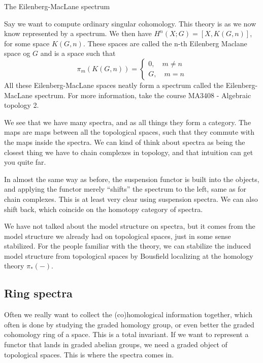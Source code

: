\begin{example}{The Eilenberg-MacLane spectrum}
    
    Say we want to compute ordinary singular cohomology. 
    This theory is as we now know represented by a spectrum. 
    We then have $H^n(X;G) = [X, K(G, n)]$, for some space $K(G, n)$. 
    These spaces are called the n-th Eilenberg Maclane space og $G$ and is a space such that 
    \begin{equation*}
        \pi_m(K(G, n)) = 
        \begin{cases}
            0, \quad m\neq n \\
            G, \quad m=n
        \end{cases}
    \end{equation*}
    All these Eilenberg-MacLane spaces neatly form a spectrum called the Eilenberg-MacLane spectrum. 
    For more information, take the course MA3408 - Algebraic topology 2.
\end{example}

We see that we have many spectra, 
and as all things they form a category. 
The maps are maps between all the topological spaces, 
such that they commute with the maps inside the spectra. 
We can kind of think about spectra as being the closest thing we have to chain complexes in topology, 
and that intuition can get you quite far. 

In almost the same way as before, 
the suspension functor is built into the objects, 
and applying the functor merely ``shifts'' the spectrum to the left, 
same as for chain complexes. 
This is at least very clear using suspension spectra. 
We can also shift back, 
which coincide on the homotopy category of spectra. 

We have not talked about the model structure on spectra, 
but it comes from the model structure we already had on topological spaces, 
just in some sense stabilized. 
For the people familiar with the theory, 
we can stabilize the induced model structure from topological spaces by Bousfield localizing at the homology theory $\pi_\ast(-)$. 

\subsection*{Ring spectra}

Often we really want to collect the (co)homological information together, 
which often is done by studying the graded homology group, 
or even better the graded cohomology ring of a space. 
This is a total invariant. 
If we want to represent a functor that lands in graded abelian groups, 
we need a graded object of topological spaces. 
This is where the spectra comes in. 

